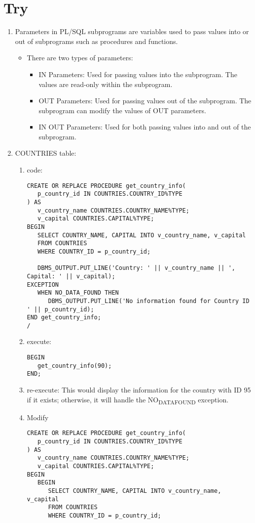 \documentclass[11pt]{article}
\begin{document}
\section{Try}
\label{sec:orgb3ce8b8}
\begin{enumerate}
\item Parameters in PL/SQL subprograms are variables used to pass values into or out of subprograms such as procedures and functions.
\begin{itemize}
\item There are two types of parameters:
\begin{itemize}
\item IN Parameters: Used for passing values into the subprogram. The values are read-only within the subprogram.
\item OUT Parameters: Used for passing values out of the subprogram. The subprogram can modify the values of OUT parameters.
\item IN OUT Parameters: Used for both passing values into and out of the subprogram.
\end{itemize}
\end{itemize}
\item COUNTRIES table:
\begin{enumerate}
\item code:
\begin{verbatim}
CREATE OR REPLACE PROCEDURE get_country_info(
   p_country_id IN COUNTRIES.COUNTRY_ID%TYPE
) AS
   v_country_name COUNTRIES.COUNTRY_NAME%TYPE;
   v_capital COUNTRIES.CAPITAL%TYPE;
BEGIN
   SELECT COUNTRY_NAME, CAPITAL INTO v_country_name, v_capital
   FROM COUNTRIES
   WHERE COUNTRY_ID = p_country_id;

   DBMS_OUTPUT.PUT_LINE('Country: ' || v_country_name || ', Capital: ' || v_capital);
EXCEPTION
   WHEN NO_DATA_FOUND THEN
      DBMS_OUTPUT.PUT_LINE('No information found for Country ID ' || p_country_id);
END get_country_info;
/
\end{verbatim}

\item execute:
\begin{verbatim}
BEGIN
   get_country_info(90);
END;
\end{verbatim}

\item re-execute: This would display the information for the country with ID 95 if it exists; otherwise, it will handle the NO\textsubscript{DATA}\textsubscript{FOUND} exception.

\item Modify
\begin{verbatim}
CREATE OR REPLACE PROCEDURE get_country_info(
   p_country_id IN COUNTRIES.COUNTRY_ID%TYPE
) AS
   v_country_name COUNTRIES.COUNTRY_NAME%TYPE;
   v_capital COUNTRIES.CAPITAL%TYPE;
BEGIN
   BEGIN
      SELECT COUNTRY_NAME, CAPITAL INTO v_country_name, v_capital
      FROM COUNTRIES
      WHERE COUNTRY_ID = p_country_id;


\end{verbatim}
\end{enumerate}
\end{enumerate}
\end{document}
